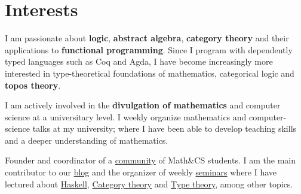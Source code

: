 \documentclass[nocolors]{friggeri-cv-a4}
\begin{document}
\section{Interests}

I am passionate about \textbf{logic}, \textbf{abstract algebra}, \textbf{category theory} and their
applications to \textbf{functional programming}. Since I program with dependently
typed languages such as Coq and Agda, I have become increasingly more interested
in type-theoretical foundations of mathematics, categorical
logic and \textbf{topos theory}.

I am actively involved in the \textbf{divulgation of mathematics} and computer
science at a universitary level. I weekly organize mathematics and
computer-science talks at my university; where I have been able to
develop teaching skills and a deeper understanding of mathematics.

\begin{entrylist}
{ Founder and coordinator of a \href{http://libreim.github.io/}{community} of Math\&CS students.
  I am the main contributor to our \href{http://libreim.github.io/blog/}{blog} and
  the organizer of weekly \href{http://libreim.github.io/dgiim/awesome/seminars/}{seminars} where I have lectured about
  \href{https://github.com/libreim/haskell}{Haskell},
  \href{https://github.com/libreim/introCategorias/blob/master/categorias.pdf}{Category theory}
  and \href{https://github.com/libreim/curryHoward/blob/master/CurryHoward.pdf}{Type theory},
  among other topics.
}
\end{entrylist}
\end{document}
